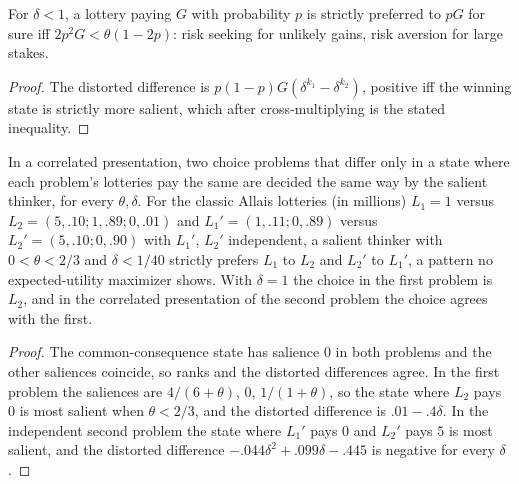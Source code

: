 \begin{theorem}
\label{thm:beh-longshot}
\leanok
{}
For $\delta<1$, a lottery paying $G$ with probability $p$ is strictly preferred to $pG$ for sure iff
$2p^2G<\theta(1-2p)$: risk seeking for unlikely gains, risk aversion for large stakes.
\end{theorem}
\begin{proof}
\leanok
The distorted difference is $p(1-p)G(\delta^{k_1}-\delta^{k_2})$, positive iff the winning state is strictly more
salient, which after cross-multiplying is the stated inequality.
\end{proof}

\begin{theorem}
\label{thm:beh-salience-allais}
\leanok
In a correlated presentation, two choice problems that differ only in a state where each problem's lotteries pay the same
are decided the same way by the salient thinker, for every $\theta,\delta$. For the classic Allais lotteries (in
millions) $L_1=1$ versus $L_2=(5,.10;1,.89;0,.01)$ and $L_1'=(1,.11;0,.89)$ versus $L_2'=(5,.10;0,.90)$ with $L_1'$, $L_2'$
independent, a salient thinker with $0<\theta<2/3$ and $\delta<1/40$ strictly prefers $L_1$ to $L_2$ and $L_2'$ to $L_1'$,
a pattern no expected-utility maximizer shows. With $\delta=1$ the choice in the first problem is $L_2$, and in the
correlated presentation of the second problem the choice agrees with the first.
\end{theorem}
\begin{proof}
\leanok
The common-consequence state has salience $0$ in both problems and the other saliences coincide, so ranks and the
distorted differences agree. In the first problem the saliences are $4/(6+\theta)$, $0$, $1/(1+\theta)$, so the state
where $L_2$ pays $0$ is most salient when $\theta<2/3$, and the distorted difference is $.01-.4\delta$. In the independent
second problem the state where $L_1'$ pays $0$ and $L_2'$ pays $5$ is most salient, and the distorted difference
$-.044\delta^2+.099\delta-.445$ is negative for every $\delta$.
\end{proof}

